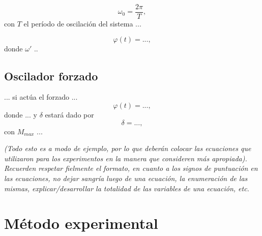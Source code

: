 \documentclass[12pt,a4paper]{article}
\begin{document}
\begin{equation}\label{eq2}
    \omega_0=\frac{2\pi}{T},
\end{equation}
con $T$ el período de oscilación del sistema ...

\begin{equation}
    \varphi(t) = ... ,
\end{equation}
donde $\omega'$ ..

\subsection{Oscilador forzado}

... si actúa el forzado ...
\begin{equation}
    \varphi(t) = ... ,
\end{equation}
donde ... y $\delta$ estará dado por
\begin{equation}
    \delta = ... ,
\end{equation}
con $M_{max}$ ...

\textit{(Todo esto es a modo de ejemplo, por lo que deberán colocar las ecuaciones que utilizaron para los experimentos en la manera que consideren más apropiada). Recuerden respetar fielmente el formato, en cuanto a los signos de puntuación en las ecuaciones, no dejar sangría luego de una ecuación, la enumeración de las mismas, explicar/desarrollar la totalidad de las variables de una ecuación, etc.}


\section{Método experimental}
\end{document}
